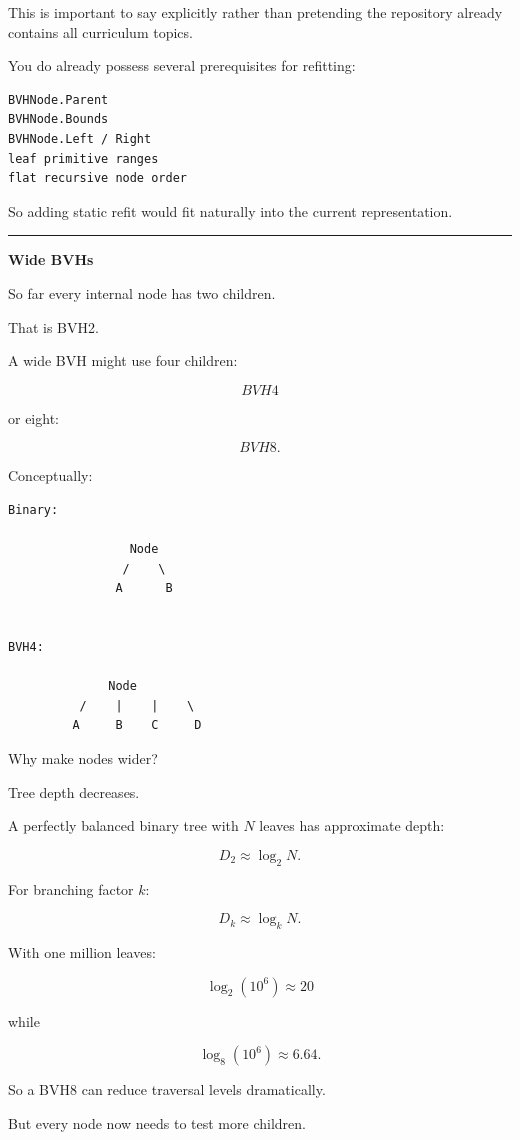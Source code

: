 This is important to say explicitly rather than pretending the repository already contains all curriculum topics.

You do already possess several prerequisites for refitting:

\begin{verbatim}
BVHNode.Parent
BVHNode.Bounds
BVHNode.Left / Right
leaf primitive ranges
flat recursive node order
\end{verbatim}

So adding static refit would fit naturally into the current representation.

\begin{center}\rule{0.5\linewidth}{0.5pt}\end{center}

\textbf{Wide BVHs}

So far every internal node has two children.

That is BVH2.

A wide BVH might use four children:

\[
BVH4
\]

or eight:

\[
BVH8.
\]

Conceptually:

\begin{verbatim}
Binary:

                 Node
                /    \
               A      B


BVH4:

              Node
          /    |    |    \
         A     B    C     D
\end{verbatim}

Why make nodes wider?

Tree depth decreases.

A perfectly balanced binary tree with \(N\) leaves has approximate depth:

\[
D_2\approx\log_2N.
\]

For branching factor \(k\):

\[
D_k\approx\log_kN.
\]

With one million leaves:

\[
\log_2(10^6)\approx20
\]

while

\[
\log_8(10^6)\approx6.64.
\]

So a BVH8 can reduce traversal levels dramatically.

But every node now needs to test more children.

